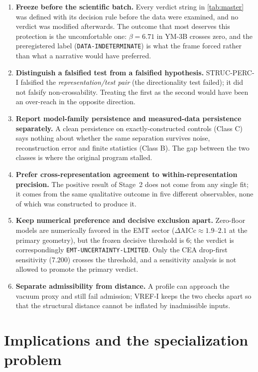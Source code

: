 \documentclass[11pt,a4paper]{article}
\theoremstyle{definition}
\theoremstyle{remark}
\begin{document}
\begin{enumerate}[label=(M\arabic*)]
\item \textbf{Freeze before the scientific batch.} Every verdict string in \cref{tab:master} was defined with its decision rule before the data were examined, and no verdict was modified afterwards. The outcome that most deserves this protection is the uncomfortable one: $\beta=6.71$ in YM-3B crosses zero, and the preregistered label (\texttt{DATA-\allowbreak{}INDETERMINATE}) is what the frame forced rather than what a narrative would have preferred.
\item \textbf{Distinguish a falsified test from a falsified hypothesis.} STRUC-PERC-I falsified the \emph{representation/test pair} (the directionality test failed); it did not falsify non-crossability. Treating the first as the second would have been an over-reach in the opposite direction.
\item \textbf{Report model-family persistence and measured-data persistence separately.} A clean persistence on exactly-constructed controls (Class C) says nothing about whether the same separation survives noise, reconstruction error and finite statistics (Class B). The gap between the two classes is where the original program stalled.
\item \textbf{Prefer cross-representation agreement to within-representation precision.} The positive result of Stage~2 does not come from any single fit; it comes from the same qualitative outcome in five different observables, none of which was constructed to produce it.
\item \textbf{Keep numerical preference and decisive exclusion apart.} Zero-floor models are numerically favored in the EMT sector ($\Delta\mathrm{AICc}\approx1.9$--$2.1$ at the primary geometry), but the frozen decisive threshold is $6$; the verdict is correspondingly \texttt{EMT-\allowbreak{}UNCERTAINTY-\allowbreak{}LIMITED}. Only the CEA drop-first sensitivity (7.200) crosses the threshold, and a sensitivity analysis is not allowed to promote the primary verdict.
\item \textbf{Separate admissibility from distance.} A profile can approach the vacuum proxy and still fail admission; VREF-I keeps the two checks apart so that the structural distance cannot be inflated by inadmissible inputs.
\end{enumerate}

\section{Implications and the specialization problem}\label{sec:implications}
\end{document}
